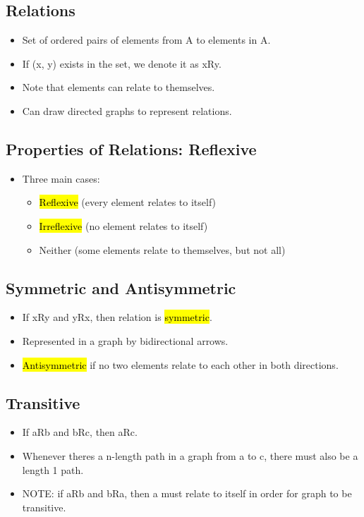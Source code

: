 \subsection{Relations}
\begin{itemize}
    \item Set of ordered pairs of elements from A to elements in A.
    \item If (x, y) exists in the set, we denote it as xRy.
    \item Note that elements can relate to themselves.
    \item Can draw directed graphs to represent relations.
\end{itemize}

\subsection{Properties of Relations: Reflexive}
\begin{itemize}
    \item Three main cases: \begin{itemize}
        \item \hl{Reflexive} (every element relates to itself)
        \item \hl{Irreflexive} (no element relates to itself)
        \item Neither (some elements relate to themselves, but not all)
    \end{itemize}
\end{itemize}

\subsection{Symmetric and Antisymmetric}
\begin{itemize}
    \item If xRy and yRx, then relation is \hl{symmetric}.
    \item Represented in a graph by bidirectional arrows.
    \item \hl{Antisymmetric} if no two elements relate to each other in both directions.
\end{itemize}

\subsection{Transitive}
\begin{itemize}
    \item If aRb and bRc, then aRc.
    \item Whenever theres a n-length path in a graph from a to c, there must also be a length 1 path.
    \item NOTE: if aRb and bRa, then a must relate to itself in order for graph to be transitive.
\end{itemize}

